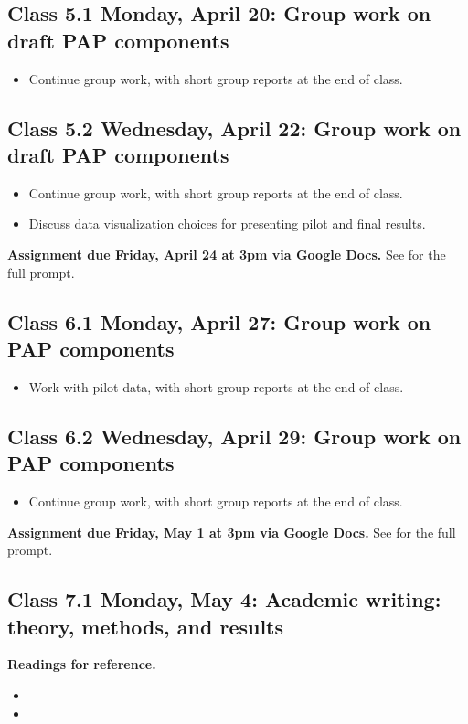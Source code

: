 \documentclass[letterpaper, 12pt, parskip=full, DIV=10]{scrartcl}
\begin{document}
\subsection*{Class 5.1 Monday, April 20: Group work on draft PAP components}
\begin{itemize}
\item Continue group work, with short group reports at the end of class.
\end{itemize}

\subsection*{Class 5.2 Wednesday, April 22: Group work on draft PAP components}
\begin{itemize}
\item Continue group work, with short group reports at the end of class.
\item Discuss data visualization choices for presenting pilot and final results.
\end{itemize}

\textbf{Assignment due Friday, April 24 at 3pm via Google Docs.}
See  for the full prompt.

\subsection*{Class 6.1 Monday, April 27: Group work on PAP components}
\begin{itemize}
\item Work with pilot data, with short group reports at the end of class.
\end{itemize}

\subsection*{Class 6.2 Wednesday, April 29: Group work on PAP components}
\begin{itemize}
\item Continue group work, with short group reports at the end of class.
\end{itemize}

\textbf{Assignment due Friday, May 1 at 3pm via Google Docs.}
See  for the full prompt.

\subsection*{Class 7.1 Monday, May 4: Academic writing: theory, methods, and results}
\textbf{Readings for reference.}
\begin{itemize}
\item {}
\item {}
\end{itemize}
\end{document}
